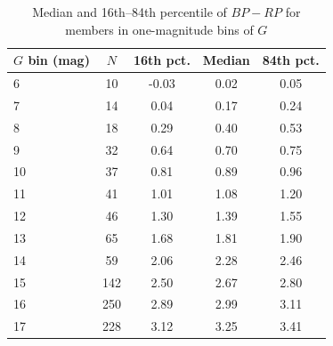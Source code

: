 \begin{table}[t]
\centering
\begin{threeparttable}
\caption{Median and 16th--84th percentile of $BP-RP$ for members in one-magnitude bins of $G$}
\label{tab:locus}
\begin{tabular}{lcccc}
\toprule
$G$ bin (mag) & $N$ & 16th pct. & Median & 84th pct. \\
\midrule
6 & 10 & -0.03 & 0.02 & 0.05 \\
7 & 14 & 0.04 & 0.17 & 0.24 \\
8 & 18 & 0.29 & 0.40 & 0.53 \\
9 & 32 & 0.64 & 0.70 & 0.75 \\
10 & 37 & 0.81 & 0.89 & 0.96 \\
11 & 41 & 1.01 & 1.08 & 1.20 \\
12 & 46 & 1.30 & 1.39 & 1.55 \\
13 & 65 & 1.68 & 1.81 & 1.90 \\
14 & 59 & 2.06 & 2.28 & 2.46 \\
15 & 142 & 2.50 & 2.67 & 2.80 \\
16 & 250 & 2.89 & 2.99 & 3.11 \\
17 & 228 & 3.12 & 3.25 & 3.41 \\
\bottomrule
\end{tabular}
\end{threeparttable}
\end{table}
